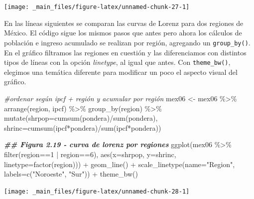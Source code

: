 \documentclass[
]{book}
\newenvironment{Shaded}{\begin{snugshade}}{\end{snugshade}}
\newcommand{\AttributeTok}[1]{\textcolor[rgb]{0.77,0.63,0.00}{#1}}
\newcommand{\CommentTok}[1]{\textcolor[rgb]{0.56,0.35,0.01}{\textit{#1}}}
\newcommand{\DecValTok}[1]{\textcolor[rgb]{0.00,0.00,0.81}{#1}}
\newcommand{\DocumentationTok}[1]{\textcolor[rgb]{0.56,0.35,0.01}{\textbf{\textit{#1}}}}
\newcommand{\FunctionTok}[1]{\textcolor[rgb]{0.00,0.00,0.00}{#1}}
\newcommand{\NormalTok}[1]{#1}
\newcommand{\OtherTok}[1]{\textcolor[rgb]{0.56,0.35,0.01}{#1}}
\newcommand{\SpecialCharTok}[1]{\textcolor[rgb]{0.00,0.00,0.00}{#1}}
\newcommand{\StringTok}[1]{\textcolor[rgb]{0.31,0.60,0.02}{#1}}
\begin{document}
\texttt{[image: \_main\_files/figure-latex/unnamed-chunk-27-1]}

En las líneas siguientes se comparan las curvas de Lorenz para dos regiones de México. El código sigue los mismos pasos que antes pero ahora los cálculos de población e ingreso acumulado se realizan por región, agregando un \texttt{group\_by()}. En el gráfico filtramos las regiones en cuestión y las diferenciamos con distintos tipos de líneas con la opción \emph{linetype}, al igual que antes. Con \texttt{theme\_bw()}, elegimos una temática diferente para modificar un poco el aspecto visual del gráfico.

\begin{Shaded}
\begin{Highlighting}[]
\CommentTok{\#ordenar según ipcf + región y acumular por región}
\NormalTok{mex06 }\OtherTok{\textless{}{-}}\NormalTok{ mex06 }\SpecialCharTok{\%\textgreater{}\%} \FunctionTok{arrange}\NormalTok{(region, ipcf) }\SpecialCharTok{\%\textgreater{}\%} 
                   \FunctionTok{group\_by}\NormalTok{(region) }\SpecialCharTok{\%\textgreater{}\%} 
                   \FunctionTok{mutate}\NormalTok{(}\AttributeTok{shrpop=}\FunctionTok{cumsum}\NormalTok{(pondera)}\SpecialCharTok{/}\FunctionTok{sum}\NormalTok{(pondera),}
                          \AttributeTok{shrinc=}\FunctionTok{cumsum}\NormalTok{(ipcf}\SpecialCharTok{*}\NormalTok{pondera)}\SpecialCharTok{/}\FunctionTok{sum}\NormalTok{(ipcf}\SpecialCharTok{*}\NormalTok{pondera)) }

\DocumentationTok{\#\# Figura 2.19 {-} curva de lorenz por regiones}
\FunctionTok{ggplot}\NormalTok{(mex06 }\SpecialCharTok{\%\textgreater{}\%} \FunctionTok{filter}\NormalTok{(region}\SpecialCharTok{==}\DecValTok{1} \SpecialCharTok{|}\NormalTok{ region}\SpecialCharTok{==}\DecValTok{6}\NormalTok{),}
       \FunctionTok{aes}\NormalTok{(}\AttributeTok{x=}\NormalTok{shrpop, }\AttributeTok{y=}\NormalTok{shrinc, }\AttributeTok{linetype=}\FunctionTok{factor}\NormalTok{(region))) }\SpecialCharTok{+}
  \FunctionTok{geom\_line}\NormalTok{() }\SpecialCharTok{+}
  \FunctionTok{scale\_linetype}\NormalTok{(}\AttributeTok{name=}\StringTok{"Region"}\NormalTok{, }\AttributeTok{labels=}\FunctionTok{c}\NormalTok{(}\StringTok{"Noroeste"}\NormalTok{, }\StringTok{"Sur"}\NormalTok{)) }\SpecialCharTok{+}
  \FunctionTok{theme\_bw}\NormalTok{()}
\end{Highlighting}
\end{Shaded}

\texttt{[image: \_main\_files/figure-latex/unnamed-chunk-28-1]}
\end{document}
